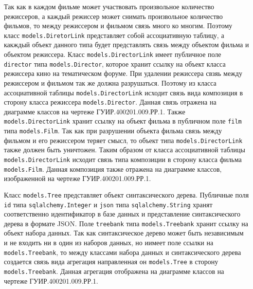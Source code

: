 Так как в каждом фильме может участвовать произвольное количество режиссеров, а каждый режиссер может снимать произвольное количество фильмов, то между режиссером и фильмом связь много ко многим. Поэтому класс \texttt{models.DiretorLink} представляет собой ассоциативную таблицу, а какждый объект данного типа будет представлять связь между объектом фильма и объектом режиссера. Класс \texttt{models.DirectorLink} имеет публичное поле \texttt{director} типа \texttt{models.Director}, которое хранит ссылку на объект класса режиссера кино на тематическом форуме. При удалении режиссера свзяь между режиссером и фильмом так же должна разрушаться. Поэтому из класса ассоциативной таблицы \texttt{models.DirectorLink} исходит связь вида композиция в сторону класса режиссера \texttt{models.Director}. Данная связь отражена на диаграмме классов на чертеже ГУИР.400201.009.РР.1. Также \texttt{models.Di\-rectorLink} хранит ссылку на объект фильма в публичном поле \texttt{film} типа \texttt{models.Film}. Так как при разрушении объекта фильма связь между фильмом и его режиссером теряет смысл, то объект типа \texttt{models.DirectorLink} также должен быть уничтожен. Таким образом от класса ассоциативной таблицы \texttt{models.DirectorLink} исходит связь типа композиции в сторону класса фильма \texttt{models.Film}. Данная композиция также отражена на диаграмме классов, изображенной на чертеже ГУИР.400201.009.РР.1.

Класс \texttt{models.Tree} представляет объект синтаксического дерева. Публичные поля \texttt{id} типа \texttt{sqlalchemy.Integer} и \texttt{json} типа \texttt{sqlalchemy.String} хранят соответственно идентификатор в базе данных и представление синтаксического дерева в формате JSON\@. Поле \texttt{treebank} типа \texttt{models.Treebank} хранит ссылку на объект набора данных. Так как синтаксическое дерево может быть независимым и не входить ни в один из наборов данных, но иимеет поле ссылки на \texttt{models.Treebank}, то между классами набора данных и синтаксического дерева создается связь вида агрегация направленная он \texttt{mo\-dels.Tree} в сторону \texttt{models.Treebank}. Данная агрегация отображена на диаграмме классов на чертеже ГУИР.400201.009.РР.1.

